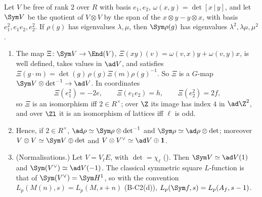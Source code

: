 \begin{proposition}\label{prop:reps:sym2}
Let $V$ be free of rank $2$ over $R$ with basis $e_1,e_2$, $\omega(x,y)=\det[x\,|\,y]$, and let $\Sym V$ be the quotient of $V\otimes V$ by the span of the
$x\otimes y-y\otimes x$, with basis $e_1^2,e_1e_2,e_2^2$. If $\rho(g)$ has eigenvalues $\lambda,\mu$, then $\Sym\rho(g)$ has eigenvalues $\lambda^2,\lambda\mu,\mu^2$.
\begin{enumerate}[label=(\roman*)]
\item The map $\Xi\colon\Sym V\to\End(V)$, $\Xi(xy)(v)=\omega(v,x)y+\omega(v,y)x$, is well defined, takes values in $\ad V$, and satisfies
$\Xi(g\cdot m)=\det(g)\,\rho(g)\Xi(m)\rho(g)^{-1}$. So $\Xi$ is a $G$-map $\Sym V\otimes\det^{-1}\to\ad V$. In coordinates
\[
\Xi(e_1^2)=-2e,\qquad\Xi(e_1e_2)=h,\qquad\Xi(e_2^2)=2f,
\]
so $\Xi$ is an isomorphism iff $2\in R^\times$; over $\Z$ its image has index $4$ in $\ad\Z^2$, and over $\Zl$ it is an isomorphism of lattices iff
$\ell$ is odd.
\item Hence, if $2\in R^\times$, $\ad\rho\simeq\Sym\rho\otimes\det^{-1}$ and $\Sym\rho\simeq\ad\rho\otimes\det$; moreover $V\otimes V\simeq\Sym V\oplus\det$ and
$V\otimes V^\vee\simeq\ad V\oplus\mathbf1$.
\item (Normalisations.) Let $V=V_\ell E$, with $\det=\chi_\ell$ (). Then $\Sym V\simeq\ad V(1)$ and $\Sym(V^\vee)\simeq\ad V(-1)$. The
classical symmetric square $L$-function is that of $\Sym(V^\vee)=\Sym H^1$, so with the convention $L_p(M(n),s)=L_p(M,s+n)$ (B-C2(d)),
$L_p(\Sym f,s)=L_p(A_f,s-1)$.
\end{enumerate}
\end{proposition}

